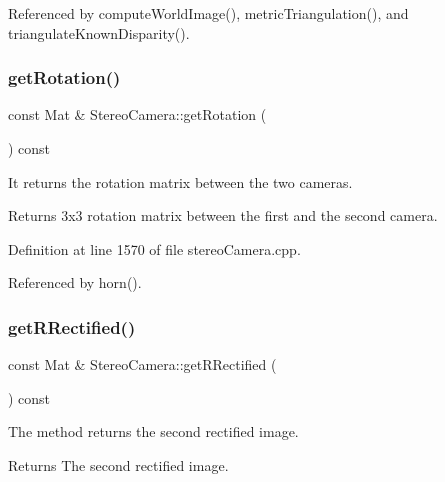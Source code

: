 Referenced by compute\+World\+Image(), metric\+Triangulation(), and triangulate\+Known\+Disparity().

\mbox{\label{classStereoCamera_a08b520f9976fc3213047844fedc02a54}} 
\subsubsection{\texorpdfstring{getRotation()}{getRotation()}}
{\footnotesize\ttfamily const Mat \& Stereo\+Camera\+::get\+Rotation (\begin{DoxyParamCaption}{ }\end{DoxyParamCaption}) const}



It returns the rotation matrix between the two cameras. 

\begin{DoxyReturn}{Returns}
3x3 rotation matrix between the first and the second camera. 
\end{DoxyReturn}


Definition at line 1570 of file stereo\+Camera.\+cpp.


\begin{DoxyCode}{0}

\end{DoxyCode}


Referenced by horn().

\mbox{\label{classStereoCamera_aff19b07a766c01d04ed623a05ef4d67d}} 
\subsubsection{\texorpdfstring{getRRectified()}{getRRectified()}}
{\footnotesize\ttfamily const Mat \& Stereo\+Camera\+::get\+R\+Rectified (\begin{DoxyParamCaption}{ }\end{DoxyParamCaption}) const}



The method returns the second rectified image. 

\begin{DoxyReturn}{Returns}
The second rectified image. 
\end{DoxyReturn}


